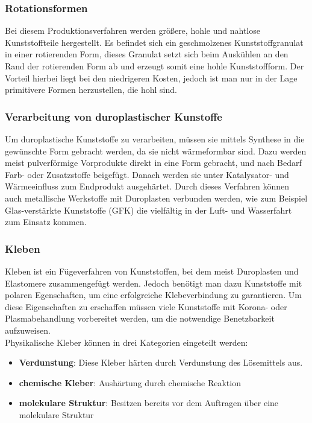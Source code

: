 \subsubsection{Rotationsformen}
Bei diesem Produktionsverfahren werden größere, hohle und nahtlose Kunststoffteile hergestellt. Es befindet sich
ein geschmolzenes Kunststoffgranulat in einer rotierenden Form, dieses Granulat setzt sich beim Auskühlen an den
Rand der rotierenden Form ab und erzeugt somit eine hohle Kunststoffform.
Der Vorteil hierbei liegt bei den niedrigeren Kosten, jedoch ist man nur in der Lage primitivere Formen herzustellen,
die hohl sind.

\subsubsection{Verarbeitung von duroplastischer Kunstoffe}
Um duroplastische Kunststoffe zu verarbeiten, müssen sie mittels Synthese in die gewünschte Form gebracht werden, da sie
nicht wärmeformbar sind. Dazu werden meist pulverförmige Vorprodukte direkt in eine Form gebracht, und nach Bedarf
Farb- oder Zusatzstoffe beigefügt. Danach werden sie unter Katalysator- und Wärmeeinfluss zum Endprodukt ausgehärtet.
Durch dieses Verfahren können auch metallische Werkstoffe mit Duroplasten verbunden werden, wie zum Beispiel
Glas-verstärkte Kunststoffe (GFK) die vielfältig in der Luft- und Wasserfahrt zum Einsatz kommen.

\subsubsection{Kleben}
Kleben ist ein Fügeverfahren von Kunststoffen, bei dem meist Duroplasten und Elastomere zusammengefügt werden.
Jedoch benötigt man dazu Kunststoffe mit polaren Egenschaften, um eine erfolgreiche Klebeverbindung zu garantieren.
Um diese Eigenschaften zu erschaffen müssen viele Kunststoffe mit Korona- oder Plasmabehandlung vorbereitet werden,
um die notwendige Benetzbarkeit aufzuweisen.\\
Physikalische Kleber können in drei Kategorien eingeteilt werden:
\begin{itemize}
    \item \textbf{Verdunstung}: Diese Kleber härten durch Verdunstung des Lösemittels aus.
    \item \textbf{chemische Kleber}: Aushärtung durch chemische Reaktion
    \item \textbf{molekulare Struktur}: Besitzen bereits vor dem Auftragen über eine molekulare Struktur
\end{itemize}

